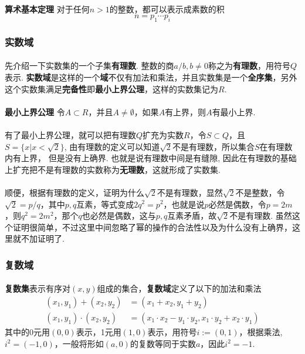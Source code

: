 \paragraph{}
\textbf{算术基本定理}\: 对于任何$n > 1$的整数，都可以表示成素数的积
$$
n = p_1 \cdots p_i
$$

\subsubsection{实数域}
\paragraph{}
先介绍一下实数集的一个子集\textbf{有理数}. 整数的商$a/b, b \neq 0$称之为\textbf{有理数}，用符号$Q$表示. \textbf{实数域}是这样的一个\textbf{域}不仅有加法和乘法，并且实数集是一个\textbf{全序集}，另外这个实数集满足\textbf{完备性}即\textbf{最小上界公理}，这样的实数集记为$R$.

\paragraph{}
\textbf{最小上界公理}\:  令$A \subset R$，并且$A \neq \emptyset$，如果$A$有上界，则$A$有最小上界.

\paragraph{}
有了最小上界公理，就可以把有理数$Q$扩充为实数$R$，令$S \subset Q$，且$S = \{x| x < \sqrt{2}\}$, 由有理数的定义可以知道$\sqrt{2}$不是有理数，所以集合$S$在有理数内有上界， 但是没有上确界. 也就是说有理数中间是有缝隙, 因此在有理数的基础上扩充把不是有理数的实数称为\textbf{无理数}，这就形成了实数集. 

\paragraph{}
顺便，根据有理数的定义，证明为什么$\sqrt{2}$不是有理数，显然$\sqrt{2}$不是整数，令$\sqrt{2} = p/q$，其中$p,q$互素，等式变成$2q^2 = p^2$，也就是说$p$必然是偶数，令$p = 2m$，则$q^2 = 2m^2$，那个$q$也必然是偶数，这与$p, q$互素矛盾，故$\sqrt{2}$不是有理数. 虽然这个证明很简单，不过这里中间忽略了幂的操作的合法性以及为什么没有上确界，这里就不加证明了. 

\subsubsection{复数域}
\paragraph{}
\textbf{复数集}表示有序对$(x, y)$组成的集合，\textbf{复数域}定义了以下的加法和乘法
\begin{align*}
(x_1, y_1) + (x_2, y_2) &= (x_1 + x_2, y_1 + y_2) \\
(x_1, y_1) \cdot (x_2, y_2) &= (x_1 \cdot x_2 - y_1 \cdot y_2, x_1 \cdot y_2 + x_2 \cdot y_1) 
\end{align*}
其中的0元用$(0, 0)$表示，1元用$(1, 0)$表示，用符号$i := (0, 1)$，根据乘法, $i^2 = (-1, 0)$，一般将形如$(a, 0)$的复数等同于实数$a$，因此$i^2 = -1$.

